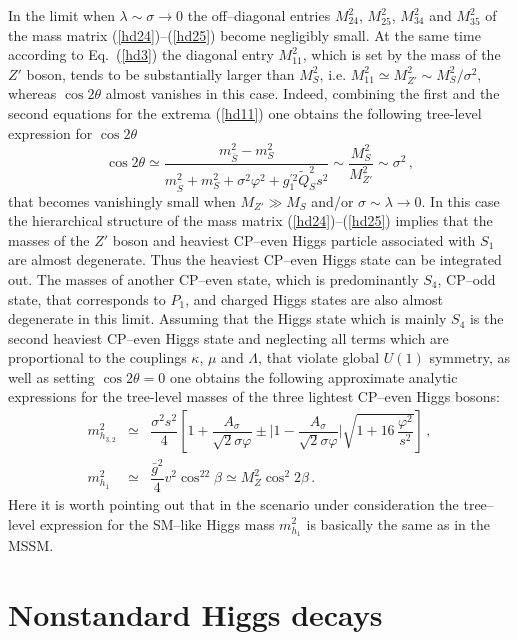 \documentclass[12pt,a4paper]{article}
\newcommand{\be}{\begin{equation}}
\newcommand{\ee}{\end{equation}}
\newcommand{\ba}{\begin{array}}
\newcommand{\ea}{\end{array}}
\begin{document}
In the limit when $\lambda \sim \sigma \to 0 $  the off--diagonal entries $M_{24}^2$, $M_{25}^2$, $M_{34}^2$
and $M_{35}^2$ of the mass matrix (\ref{hd24})--(\ref{hd25}) become negligibly small. At the same time
according to Eq.~(\ref{hd3}) the diagonal entry $M_{11}^2$, which is set by the mass of the $Z'$ boson, tends
to be substantially larger than $M_S^2$, i.e. $M_{11}^2\simeq M_{Z'}^2 \sim M_S^2/\sigma^2$, whereas
$\cos 2\theta$ almost vanishes in this case. Indeed, combining the first and the second equations for the extrema
(\ref{hd11}) one obtains the following tree-level expression for $\cos 2\theta$
\be
\cos 2\theta \simeq
\dfrac{m_{\overline{S}}^2-m_{S}^2}{m_{\overline{S}}^2+m_S^2+\sigma^2\varphi^2+g^{'2}_1 \tilde{Q}_S^2 s^2}
\sim \dfrac{M_S^2}{M_{Z'}^2}\sim \sigma^2\,,
\label{hd27}
\ee
that becomes vanishingly small when $M_{Z'}\gg M_S$ and/or $\sigma\sim \lambda\to 0$. In this case the  hierarchical structure
of the mass matrix (\ref{hd24})--(\ref{hd25}) implies that the masses of the $Z'$ boson and  heaviest CP--even Higgs particle
associated with $S_1$ are almost degenerate. Thus the heaviest CP--even Higgs state can be integrated out. The masses of
another CP--even state, which is predominantly $S_4$, CP--odd state, that corresponds to $P_1$, and charged Higgs states
are also almost degenerate in this limit. Assuming that the Higgs state which is mainly $S_4$ is the second heaviest CP--even Higgs
state and neglecting all terms which are proportional to the couplings $\kappa$, $\mu$ and $\Lambda$, that violate global $U(1)$
symmetry, as well as setting $\cos 2\theta=0$ one obtains the following approximate analytic expressions for the tree-level
masses of the three lightest CP--even Higgs bosons:
\be
\ba{lcl}
m_{h_{3,2}}^2 & \simeq & \dfrac{\sigma^2 s^2}{4}\left[1+\dfrac{A_{\sigma}}{\sqrt{2}\sigma \varphi} \pm
\biggl|1 - \dfrac{A_{\sigma}}{\sqrt{2}\sigma \varphi}\biggr|\sqrt{1+16\,\dfrac{\varphi^2}{s^2}}\right]\,,\\[2mm]
m_{h_{1}}^2 & \simeq & \dfrac{\bar{g}^2}{4}v^2\cos^22\beta\simeq M_{Z}^2 \cos^2 2\beta\,.
\ea
\label{hd28}
\ee
Here it is worth pointing out that in the scenario under consideration the tree--level expression for the SM--like Higgs mass
$m_{h_{1}}^2$ is basically the same as in the MSSM.



\section{Nonstandard Higgs decays}
\end{document}
